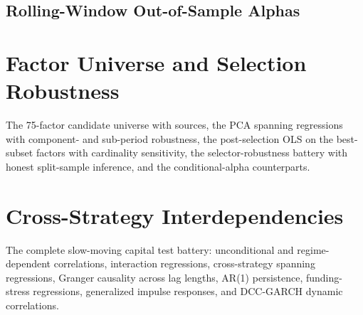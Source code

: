 \subsection{Rolling-Window Out-of-Sample Alphas}\label{app:oos_rolling}

\clearpage
\section{Factor Universe and Selection Robustness}\label{app:selection}

The 75-factor candidate universe with sources, the PCA spanning regressions
with component- and sub-period robustness, the post-selection OLS on the
best-subset factors with cardinality sensitivity, the selector-robustness
battery with honest split-sample inference, and the conditional-alpha
counterparts.


\clearpage
\section{Cross-Strategy Interdependencies}\label{app:smc}

The complete slow-moving capital test battery: unconditional and
regime-dependent correlations, interaction regressions, cross-strategy
spanning regressions, Granger causality across lag lengths, AR(1) persistence,
funding-stress regressions, generalized impulse responses, and DCC-GARCH
dynamic correlations.



